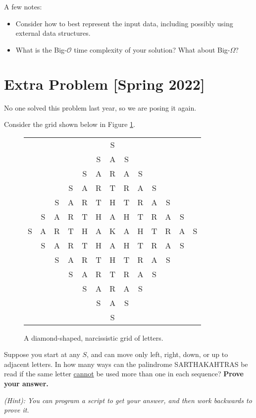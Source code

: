 \documentclass{article}
\begin{document}
    \vspace{2mm}
    A few notes:
    \begin{itemize}
        \item Consider how to best represent the input data, including possibly using external data structures.
        \item What is the Big-$\mathcal{O}$ time complexity of your solution? What about Big-$\Omega$?
    \end{itemize}

\pagebreak

\section*{Extra Problem [Spring 2022]}
    No one solved this problem last year, so we are posing it again.
    
    \vspace{2mm}
    Consider the grid shown below in Figure \ref*{E2}.
    
    \vspace{1mm}
    \setlength{\tabcolsep}{2.7pt}
    \begin{figure}[hbp]
        \centering
        \begin{tabular}{ccccccccccccc}
            & & & & & & S \\
            & & & & & S & A & S \\
            & & & & S & A & R & A & S \\
            & & & S & A & R & T & R & A & S \\
            & & S & A & R & T & H & T & R & A & S \\
            & S & A & R & T & H & A & H & T & R & A & S \\
            S & A & R & T & H & A & K & A & H & T & R & A & S \\
            & S & A & R & T & H & A & H & T & R & A & S \\
            & & S & A & R & T & H & T & R & A & S \\
            & & & S & A & R & T & R & A & S \\
            & & & & S & A & R & A & S \\
            & & & & & S & A & S \\
            & & & & & & S
        \end{tabular}
        \caption{A diamond-shaped, narcissistic grid of letters.}
        \label{E2}
    \end{figure}
    
    Suppose you start at any $S$, and can move only left, right, down, or up to adjacent letters. In how many ways can the palindrome SARTHAKAHTRAS be read if the same letter \underline{cannot} be used more than one in each sequence? \textbf{Prove your answer.}

    \vspace{2mm}
    \textit{(Hint): You can program a script to get your answer, and then work backwards to prove it.}
\end{document}
